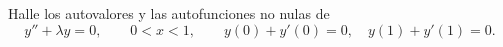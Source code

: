Halle los autovalores y las autofunciones no nulas de
\[y''+\lambda y=0,\qquad0<x<1,\qquad y(0)+y'(0)=0,\quad y(1)+y'(1)=0.\]

